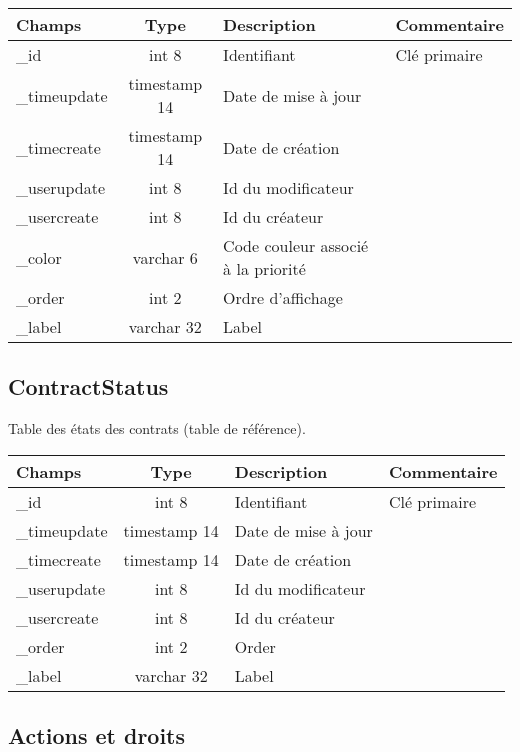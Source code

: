 \begin{tabular}{|p{3cm}|c|p{5.4cm}|p{2.6cm}|}
\hline
\textbf{Champs} & \textbf{Type} & \textbf{Description} & \textbf{Commentaire} \\
\hline
\_id & int 8 & Identifiant & Clé primaire \\
\hline
\_timeupdate & timestamp 14 & Date de mise à jour & \\
\hline
\_timecreate & timestamp 14 & Date de création & \\
\hline
\_userupdate & int 8 & Id du modificateur & \\
\hline
\_usercreate & int 8 & Id du créateur & \\
\hline
\_color & varchar 6 & Code couleur associé à la priorité \\
\hline
\_order & int 2 & Ordre d'affichage & \\
\hline
\_label & varchar 32 & Label & \\
\hline
\end{tabular}


\subsection{ContractStatus}

Table des états des contrats (table de référence).\\

\begin{tabular}{|p{3cm}|c|p{5.4cm}|p{2.6cm}|}
\hline
\textbf{Champs} & \textbf{Type} & \textbf{Description} & \textbf{Commentaire} \\
\hline
\_id & int 8 & Identifiant & Clé primaire \\
\hline
\_timeupdate & timestamp 14 & Date de mise à jour & \\
\hline
\_timecreate & timestamp 14 & Date de création & \\
\hline
\_userupdate & int 8 & Id du modificateur & \\
\hline
\_usercreate & int 8 & Id du créateur & \\
\hline
\_order & int 2 & Order & \\
\hline
\_label & varchar 32 & Label \\
\hline
\end{tabular}


\subsection{Actions et droits}

